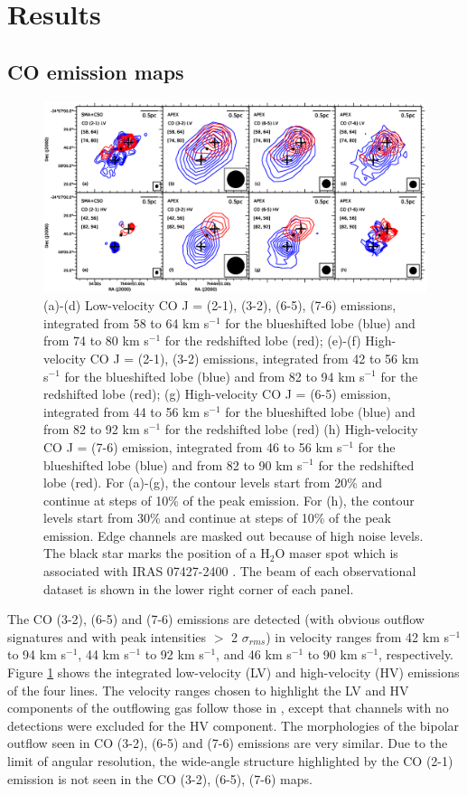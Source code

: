 \section{Results}
\subsection{CO emission maps}

\begin{figure}[htbp]
\includegraphics[scale=.65]{./fig/ori_contourall.eps}
\caption{(a)-(d) Low-velocity CO J = (2-1), (3-2), (6-5), (7-6) emissions, integrated from 58 to 64 km s$^{-1} $ for the blueshifted lobe (blue) and from 74 to 80 km s$^{-1}$ for the redshifted lobe (red); (e)-(f) High-velocity CO J = (2-1), (3-2) emissions,  integrated from 42 to 56 km s$^{-1} $ for the blueshifted lobe (blue) and from 82 to 94 km s$^{-1}$ for the redshifted lobe (red); (g) High-velocity CO J = (6-5) emission, integrated from 44 to 56 km s$^{-1} $ for the blueshifted lobe (blue) and from 82 to 92 km s$^{-1}$ for the redshifted lobe (red) (h) High-velocity CO J = (7-6) emission, integrated from 46 to 56 km s$^{-1} $ for the blueshifted lobe (blue) and from 82 to 90 km s$^{-1}$ for the redshifted lobe (red). For (a)-(g), the contour levels start from 20\% and continue at steps of 10\% of the peak emission. For (h), the contour levels start from 30\% and continue at steps of 10\% of the peak emission. Edge channels are masked out because of high noise levels. The black star marks the position of a H$_2$O maser spot which is associated with IRAS 07427-2400 \citep{2015PASJ...67...69S}. The beam of each observational dataset is shown in the lower right corner of each panel. \label{fig:figcontour}}
\end{figure}

The CO (3-2), (6-5) and (7-6) emissions are detected (with obvious outflow signatures and with peak intensities $>$ 2 $\sigma_{rms}$) in velocity ranges from 42 km s$^{-1}$ to 94 km s$^{-1}$, 44 km s$^{-1}$ to 92 km s$^{-1}$, and 46 km s$^{-1}$ to 90 km s$^{-1}$, respectively. Figure \ref{fig:figcontour} shows the integrated low-velocity (LV) and high-velocity (HV) emissions of the four lines. The velocity ranges chosen to highlight the LV and HV components of the outflowing gas follow those in \citet{2009ApJ...696...66Q}, except that channels with no detections were excluded for the HV component. The morphologies of the bipolar outflow seen in CO (3-2), (6-5) and (7-6) emissions are very similar. Due to the limit of angular resolution, the wide-angle structure highlighted by the CO (2-1) emission is not seen in the CO (3-2), (6-5), (7-6) maps.

